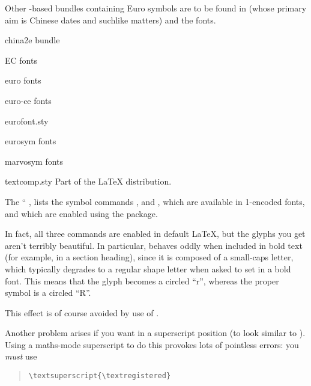 Other \MF{}-based bundles containing Euro symbols are to be found in
 (whose primary aim is Chinese dates and suchlike
matters) and the  fonts.
\begin{ctanrefs}
\item[china2e bundle]
\item[EC fonts]
\item[euro fonts]
\item[euro-ce fonts]
\item[eurofont.sty]
\item[eurosym fonts]
\item[marvosym fonts]
\item[textcomp.sty]Part of the \LaTeX{} distribution.
\end{ctanrefs}


The ``%
, lists
the symbol commands ,
 and , which are available in
1-encoded fonts, and which are enabled using the
 package.

In fact, all three commands are enabled in default \LaTeX{}, but the
glyphs you get aren't terribly beautiful.  In particular,
 behaves oddly when included in bold text (for
example, in a section heading), since it is composed of a small-caps
letter, which typically degrades to a regular shape letter when asked
to set in a bold font.  This means that the glyph becomes a circled
``r'', whereas the proper symbol is a circled ``R''.

This effect is of course avoided by use of .

Another problem arises if you want  in a
superscript position (to look similar to ).
Using a maths-mode superscript to do this provokes lots of pointless
errors: you \emph{must} use
\begin{quote}
\begin{verbatim}
\textsuperscript{\textregistered}
\end{verbatim}
\end{quote}


